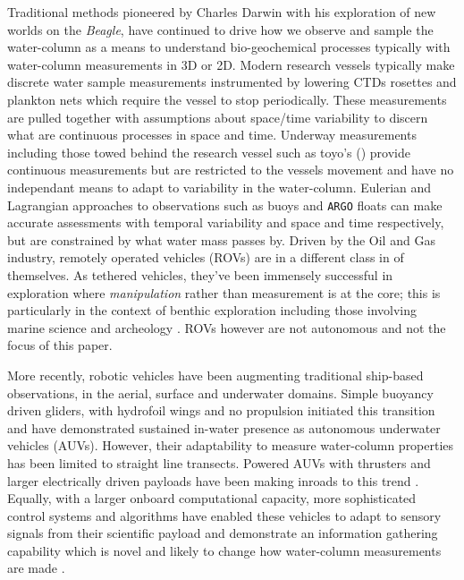 \documentclass[12pt]{article}
\begin{document}
Traditional methods pioneered by Charles Darwin with his exploration
of new worlds on the \emph{Beagle}, have continued to drive how we
observe and sample the water-column as a means to understand
bio-geochemical processes typically with water-column measurements in
3D or 2D.  Modern research vessels typically make discrete water
sample measurements instrumented by lowering CTDs rosettes and
plankton nets which require the vessel to stop periodically. These
measurements are pulled together with assumptions about space/time
variability to discern what are continuous processes in space and
time. Underway measurements including those towed behind the research
vessel such as toyo's () provide continuous measurements but
are restricted to the vessels movement and have no independant means
to adapt to variability in the water-column. Eulerian and Lagrangian
approaches to observations such as buoys and \texttt{ARGO} floats
\cite{roemmich09} can make accurate assessments with temporal
variability and space and time respectively, but are constrained by
what water mass passes by. Driven by the Oil and Gas industry,
remotely operated vehicles (ROVs) are in a different class in of
themselves. As tethered vehicles, they've been immensely successful in
exploration where \emph{manipulation} rather than measurement is at
the core; this is particularly in the context of benthic exploration
including those involving marine science \cite{yoerger00,robi17} and
archeology \cite{coleman00}. ROVs however are not autonomous and not
the focus of this paper.

More recently, robotic vehicles have been augmenting traditional
ship-based observations, in the aerial, surface and underwater
domains. Simple buoyancy driven gliders, with hydrofoil wings and no
propulsion initiated this transition and have demonstrated sustained
in-water presence \cite{rucool11} as autonomous underwater vehicles
(AUVs). However, their adaptability to measure water-column properties
has been limited to straight line transects. Powered AUVs with
thrusters and larger electrically driven payloads have been making
inroads to this trend \cite{loch89,dorado2004,Bellingham07}. Equally,
with a larger onboard computational capacity, more sophisticated
control systems and algorithms have enabled these vehicles to adapt to
sensory signals from their scientific payload and demonstrate an
information gathering capability which is novel and likely to change
how water-column measurements are made
\cite{bellingham94,aosn93,ryan10,das11b,das15,fossum18,fossum18b}.
\end{document}
